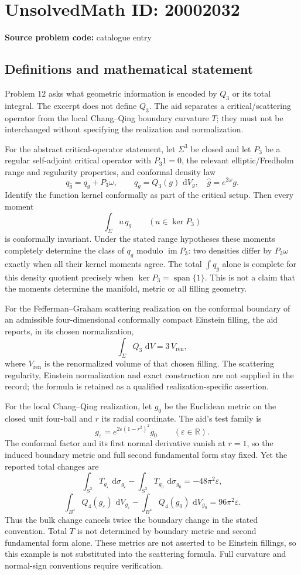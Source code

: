 \documentclass[11pt]{article}
\newcommand{\R}{\mathbb{R}}
\newcommand{\eps}{\varepsilon}
\newcommand{\dd}{\,\mathrm{d}}
\begin{document}
\section*{UnsolvedMath ID: 20002032}
\textbf{Source problem code:} catalogue entry
\subsection{Definitions and mathematical statement}
Problem \(12\) asks what geometric information is encoded by \(Q_3\) or its total integral. The excerpt does not define \(Q_3\). The aid separates a critical/scattering operator from the local Chang--Qing boundary curvature \(T\); they must not be interchanged without specifying the realization and normalization.

For the abstract critical-operator statement, let \(\Sigma^3\) be closed and let \(P_3\) be a regular self-adjoint critical operator with \(P_3 1=0\), the relevant elliptic/Fredholm range and regularity properties, and conformal density law
\[
 q_{\widehat g}=q_g+P_3\omega,\qquad q_g=Q_3(g)\,\dd V_g,
 \quad\widehat g=e^{2\omega}g.
\]
Identify the function kernel conformally as part of the critical setup. Then every moment
\[
 \int_\Sigma u\,q_g\qquad(u\in\ker P_3)
\]
is conformally invariant. Under the stated range hypotheses these moments completely determine the class of \(q_g\) modulo \(\operatorname{im}P_3\): two densities differ by \(P_3\omega\) exactly when all their kernel moments agree. The total \(\int q_g\) alone is complete for this density quotient precisely when \(\ker P_3=\operatorname{span}\{1\}\). This is not a claim that the moments determine the manifold, metric or all filling geometry.

For the Fefferman--Graham scattering realization on the conformal boundary of an admissible four-dimensional conformally compact Einstein filling, the aid reports, in its chosen normalization,
\[
 \int_\Sigma Q_3\,\dd V=3\,V_{\mathrm{ren}},
\]
where \(V_{\mathrm{ren}}\) is the renormalized volume of that chosen filling. The scattering regularity, Einstein normalization and exact construction are not supplied in the record; the formula is retained as a qualified realization-specific assertion.

For the local Chang--Qing realization, let \(g_0\) be the Euclidean metric on the closed unit four-ball and \(r\) its radial coordinate. The aid's test family is
\[
 g_\eps=e^{2\eps(1-r^2)^2}g_0\qquad(\eps\in\R).
\]
The conformal factor and its first normal derivative vanish at \(r=1\), so the induced boundary metric and full second fundamental form stay fixed. Yet the reported total changes are
\[
 \int_{S^3}T_{g_\eps}\,\dd\sigma_{g_\eps}
       -\int_{S^3}T_{g_0}\,\dd\sigma_{g_0}=-48\pi^2\eps,
\]
\[
 \int_{B^4}Q_4(g_\eps)\,\dd V_{g_\eps}
       -\int_{B^4}Q_4(g_0)\,\dd V_{g_0}=96\pi^2\eps.
\]
Thus the bulk change cancels twice the boundary change in the stated convention. Total \(T\) is not determined by boundary metric and second fundamental form alone. These metrics are not asserted to be Einstein fillings, so this example is not substituted into the scattering formula. Full curvature and normal-sign conventions require verification.
\end{document}
